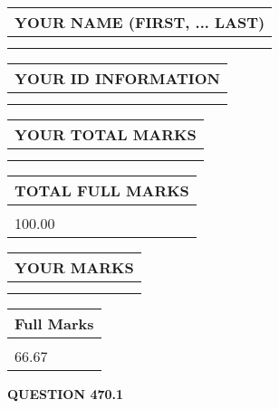 \documentclass{ctexart}
\begin{document}
   
   
   
\newpage 
\setcounter{page}{ 
   470001 } 
   
   
   
   
\noindent\begin{tabular}{|l|}
\hline
YOUR NAME (FIRST, ... LAST)  \\
\hline
 \\ 
 \\ 
\hline
\end{tabular}
\hspace{0.05in} \begin{tabular}{|l|}
\hline
 YOUR   ID   INFORMATION  \\
\hline
 \\ 
 \\ 
\hline
\end{tabular}
   
   
\vspace{0.2in}\noindent\begin{tabular}{|l|}
\hline
YOUR TOTAL MARKS  \\
\hline
 \\ 
 \\ 
\hline
\end{tabular}
\hspace{0.05in} \begin{tabular}{|l|}
\hline
TOTAL FULL MARKS  \\
\hline
 \\ 
100.00 \\
\hline
\end{tabular}
   
   
 \vspace{0.2in}
 
 
 
 
   
   
  
\vspace{0.2in}
  
\noindent\begin{tabular}{|l|}
\hline
 YOUR MARKS  \\
\hline
 \\ 
 \\ 
\hline
\end{tabular}
\hspace{0.05in} \begin{tabular}{|l|}
\hline
 Full Marks  \\
\hline
 \\ 
66.67 \\
\hline
\end{tabular}
{\textbf{\Large{QUESTION
470.1 
}}}
  
\end{document}
